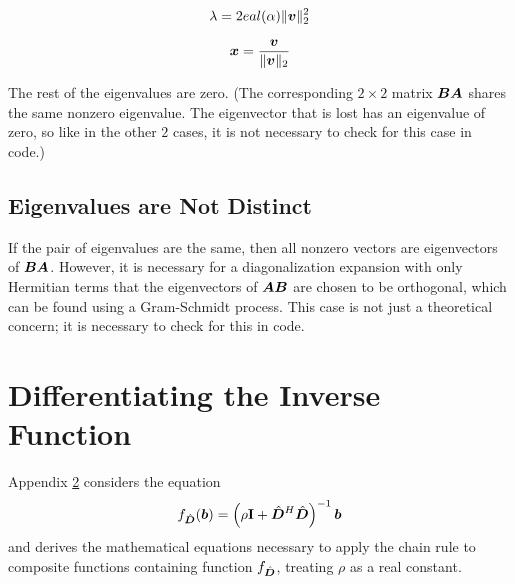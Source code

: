 \begin{appendices}
\begin{equation}
\lambda = 2
eal(\alpha) \|\bm{v}\|_2^2
\end{equation}

\begin{equation}
\bm{x} = \frac{\bm{v}}{\|\bm{v}\|_2}
\end{equation}

The rest of the eigenvalues are zero.  (The corresponding $2 \times 2$ matrix $\bm{B}\bm{A}$ shares the same nonzero eigenvalue. The eigenvector that is lost has an eigenvalue of zero, so like in the other $2$ cases, it is not necessary to check for this case in code.)

\section{Eigenvalues are Not Distinct}

If the pair of eigenvalues are the same, then all nonzero vectors are eigenvectors of $\bm{B}\bm{A}$. However, it is necessary for a diagonalization expansion with only Hermitian terms that the eigenvectors of $\bm{A}\bm{B}$ are chosen to be orthogonal, which can be found using a Gram-Schmidt process. This case is not just a theoretical concern; it is necessary to check for this in code.

\chapter{Differentiating the Inverse Function} \label{chapter:Differentiating the Inverse Function}
Appendix \ref{chapter:Differentiating the Inverse Function} considers the equation
\begin{equation}
f_{\hat{\bm{D}}}(\bm{b}) = \left(\rho{\bf I} + \hat{\bm{D}}^H\hat{\bm{D}}\right)^{-1}\bm{b} \label{equation:Standard Inversion Function}
\end{equation}
and derives the mathematical equations necessary to apply the chain rule to composite functions containing function $f_{\hat{\bm{D}}}$, treating $\rho$ as a real constant.


\end{appendices}
